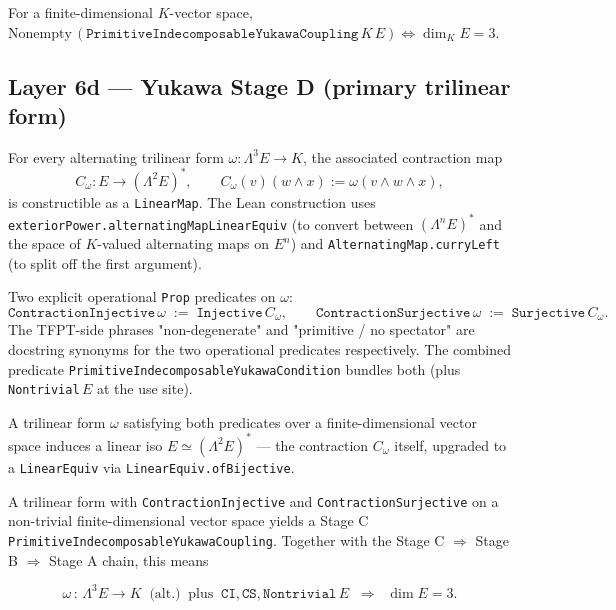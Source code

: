 \documentclass[11pt,a4paper]{article}
\begin{document}
\begin{theorem}
For a finite-dimensional $K$-vector space,
$\text{Nonempty}\,(\texttt{PrimitiveIndecomposableYukawaCoupling}\,K\,E) \iff \dim_K E = 3$.
\end{theorem}

\subsection*{Layer 6d --- Yukawa Stage D (primary trilinear form)}

\begin{theorem}
For every alternating trilinear form
$\omega : \Lambda^3 E \to K$, the associated contraction map
\[
C_\omega : E \to (\Lambda^2 E)^*,
\qquad
C_\omega(v)(w \wedge x) := \omega(v \wedge w \wedge x),
\]
is constructible as a \texttt{LinearMap}. The Lean construction
uses \texttt{exteriorPower.alternatingMapLinearEquiv} (to
convert between $(\Lambda^n E)^*$ and the space of $K$-valued
alternating maps on $E^n$) and \texttt{AlternatingMap.curryLeft}
(to split off the first argument).
\end{theorem}

\begin{theorem}
Two explicit operational \texttt{Prop} predicates on $\omega$:
\[
\texttt{ContractionInjective}\,\omega \;:=\; \texttt{Injective}\,C_\omega,
\qquad
\texttt{ContractionSurjective}\,\omega \;:=\; \texttt{Surjective}\,C_\omega.
\]
The TFPT-side phrases "non-degenerate" and "primitive / no
spectator" are docstring synonyms for the two operational
predicates respectively. The combined predicate
\texttt{PrimitiveIndecomposableYukawaCondition} bundles both
(plus \texttt{Nontrivial}\,$E$ at the use site).
\end{theorem}

\begin{theorem}
A trilinear form $\omega$ satisfying both predicates over a
finite-dimensional vector space induces a linear iso
$E \simeq (\Lambda^2 E)^*$ --- the contraction $C_\omega$ itself,
upgraded to a \texttt{LinearEquiv} via
\texttt{LinearEquiv.ofBijective}.
\end{theorem}

\begin{theorem}
A trilinear form with \texttt{ContractionInjective} and
\texttt{ContractionSurjective} on a non-trivial finite-dimensional
vector space yields a Stage C
\texttt{PrimitiveIndecomposableYukawaCoupling}. Together with the
Stage C $\Rightarrow$ Stage B $\Rightarrow$ Stage A chain, this means

\[
\boxed{\;
\omega \,:\,\Lambda^3 E \to K
\;\;\text{(alt.)}\;\;\text{plus}\;\;\texttt{CI}, \texttt{CS}, \texttt{Nontrivial}\,E
\;\;\Longrightarrow\;\;
\dim E = 3.
\;}
\]
\end{theorem}
\end{document}

